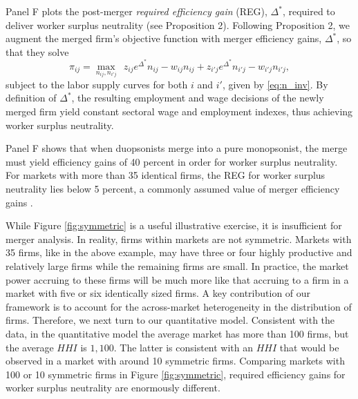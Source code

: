 \documentclass[12pt]{article}
\theoremstyle{prop}
\begin{document}
Panel F plots the post-merger \emph{required efficiency gain} (REG), $\Delta^*$,  required to deliver worker surplus neutrality (see Proposition 2). Following Proposition 2, we augment the merged firm's objective function with merger efficiency gains, $\Delta^*$, so that they solve
\begin{equation}
	\label{eq:pi_delta_augmented}
	\pi_{ij} = \max_{n_{ij}, n_{i'j}}\:\: z_{ij} e^{\Delta^*}  n_{ij}  -w_{ij}n_{ij} +z_{i'j} e^{\Delta^*}  n_{i'j}  -w_{i'j}n_{i'j},
\end{equation}
subject to the labor supply curves for both $i$ and $i'$, given by \eqref{eq:n_inv}. By definition of $\Delta^*$, the resulting employment and wage decisions of the newly merged firm yield constant sectoral wage and employment indexes, thus achieving worker surplus neutrality.

Panel F shows that when duopsonists merge into a pure monopsonist, the merge must yield efficiency gains of 40 percent in order for worker surplus neutrality. 
For markets with more than 35 identical firms, the REG for worker surplus neutrality lies below 5 percent, a commonly assumed value of merger efficiency gains \citep{farrell2010antitrust}. 

While Figure \ref{fig:symmetric} is a useful illustrative exercise, it is insufficient for merger analysis. 
In reality, firms within markets are not symmetric.  
Markets with 35 firms, like in the above example, may have three or four highly productive and relatively large firms while the remaining firms are small.
In practice, the market power accruing to these firms will be much more like that accruing to a firm in a market with five or six identically sized firms. 
A key contribution of our framework is to account for the across-market heterogeneity in the distribution of firms. 
Therefore, we next turn to our quantitative model.
Consistent with the data, in the quantitative model the average market has more than 100 firms, but the average $HHI$ is $1,100$. 
The latter is consistent with an $HHI$ that would be observed in a market with around 10 symmetric firms.
Comparing markets with 100 or 10 symmetric firms in Figure \ref{fig:symmetric}, required efficiency gains for worker surplus neutrality are enormously different.


\end{document}
